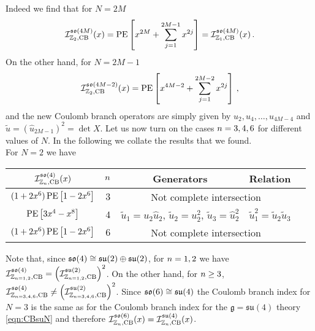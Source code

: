 \documentclass[main.tex]{subfiles}
\begin{document}
Indeed we find that for $N=2M$
\begin{equation}
\mathcal{I}_{\mathbb{Z}_2,\text{CB}}^{\mathfrak{so}(4M)}(x)=\operatorname{\mathrm{PE}}\left[x^{2M}+\sum_{j=1}^{2M-1}x^{2j}\right]=\mathcal{I}_{\mathbb{Z}_1,\text{CB}}^{\mathfrak{so}(4M)}(x)\,.
\end{equation}
On the other hand, for $N=2M-1$
\begin{equation}
\mathcal{I}_{\mathbb{Z}_2,\text{CB}}^{\mathfrak{so}(4M-2)}(x)=\operatorname{\mathrm{PE}}\left[x^{4M-2}+\sum_{j=1}^{2M-2}x^{2j}\right]\,,
\end{equation}
and the new Coulomb branch operators are simply given by $u_2,u_4,\dots,u_{4M-4}$ and $\widetilde{u}=\left(\hat{u}_{2M-1}\right)^2=\det X$.
Let us now turn on the cases ${n}=3,4,6$ for different values of $N$. In the following we collate the results that we found.\\
For $N=2$ we have
\begin{center}
\begin{tabular}{|c|c|c|c|c|}
\hline
$\mathcal{I}_{\mathbb{Z}_{n},\text{CB}}^{\mathfrak{so}(4)}(x)$&${n}$&Generators&Relation\\\hline
$(1+2x^6)\operatorname{\mathrm{PE}}\left[1-2x^6\right]$ & $3$ &\multicolumn{2}{c|}{Not complete intersection}\\\hline
$\operatorname{\mathrm{PE}}\left[3x^4-x^{8}\right]$ & $4$ & $\widetilde{u}_1=u_2\hat{u}_2$, $\widetilde{u}_2=u_2^2$, $\widetilde{u}_3=\hat{u}_2^2$&$\widetilde{u}_1^2=\widetilde{u}_2\widetilde{u}_3$\\\hline
$(1+2x^6)\operatorname{\mathrm{PE}}\left[1-2x^6\right]$ & $6$&\multicolumn{2}{c|}{Not complete intersection}\\\hline
\end{tabular}
\end{center}
Note that, since $\mathfrak{so}(4)\cong\mathfrak{su}(2)\oplus\mathfrak{su}(2)$, for $n=1,2$ we have \newline$\mathcal{I}_{\mathbb{Z}_{n=1,2},\text{CB}}^{\mathfrak{so}(4)}=\left(\mathcal{I}_{\mathbb{Z}_{n=1,2},\text{CB}}^{\mathfrak{su}(2)}\right)^2$. On the other hand, for $n\geq3$, \newline$\mathcal{I}_{\mathbb{Z}_{n=3,4,6},\text{CB}}^{\mathfrak{so}(4)}\neq \left(\mathcal{I}_{\mathbb{Z}_{n=3,4,6},\text{CB}}^{\mathfrak{su}(2)}\right)^2$. 
Since $\mathfrak{so}(6)\cong\mathfrak{su}(4)$ the Coulomb branch index for $N=3$ is the same as for the Coulomb branch index for the $\mathfrak{g}=\mathfrak{su}(4)$ theory \eqref{eqn:CBsuN} and therefore \newline$\mathcal{I}_{\mathbb{Z}_{n},\text{CB}}^{\mathfrak{so}(6)}(x)=\mathcal{I}_{\mathbb{Z}_{n},\text{CB}}^{\mathfrak{su}(4)}(x)$.
\end{document}

